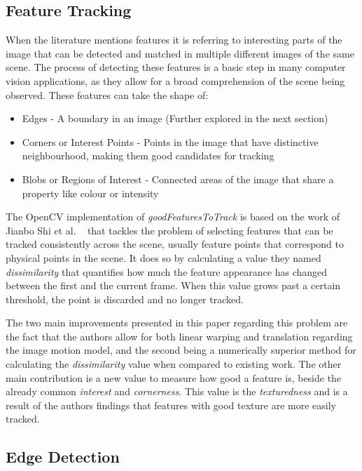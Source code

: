 \subsection{Feature Tracking}

When the literature mentions features it is referring to interesting parts of the image that can be detected and matched in multiple different images of the same scene. The process of detecting these features is a basic step in many computer vision applications, as they allow for a broad comprehension of the scene being observed. These features can take the shape of:

\begin{itemize}
	\item Edges - A boundary in an image (Further explored in the next section)
	\item Corners or Interest Points - Points in the image that have distinctive neighbourhood, making them good candidates for tracking
	\item Blobs or Regions of Interest - Connected areas of the image that share a property like colour or intensity
\end{itemize}

The OpenCV implementation of \textit{goodFeaturesToTrack} is based on the work of Jianbo Shi et al. ~\cite{shi_good_1994} that tackles the problem of selecting features that can be tracked consistently across the scene, usually feature points that correspond to physical points in the scene. It does so by calculating a value they named \textit{dissimilarity} that quantifies how much the feature appearance has changed between the first and the current frame. When this value grows past a certain threshold, the point is discarded and no longer tracked.

The two main improvements presented in this paper regarding this problem are the fact that the authors allow for both linear warping and translation regarding the image motion model, and the second being a numerically superior method for calculating the \textit{dissimilarity} value when compared to existing work. The other main contribution is a new value to measure how good a feature is, beside the already common \textit{interest} and \textit{cornerness}. This value is the \textit{texturedness} and is a result of the authors findings that features with good texture are more easily tracked.

\subsection{Edge Detection}

